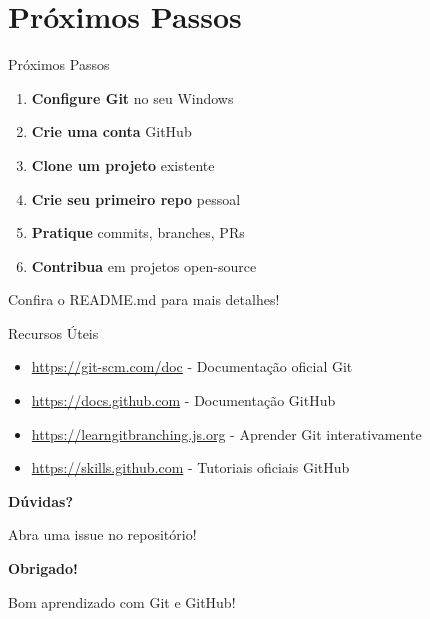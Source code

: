 \documentclass[11pt]{beamer}
\begin{document}
\section{Próximos Passos}

\begin{frame}{Próximos Passos}
\begin{enumerate}
    \item \textbf{Configure Git} no seu Windows
    \item \textbf{Crie uma conta} GitHub
    \item \textbf{Clone um projeto} existente
    \item \textbf{Crie seu primeiro repo} pessoal
    \item \textbf{Pratique} commits, branches, PRs
    \item \textbf{Contribua} em projetos open-source
\end{enumerate}

\vspace{0.5cm}

Confira o README.md para mais detalhes!
\end{frame}

\begin{frame}{Recursos Úteis}
\begin{itemize}
    \item \url{https://git-scm.com/doc} - Documentação oficial Git
    \item \url{https://docs.github.com} - Documentação GitHub
    \item \url{https://learngitbranching.js.org} - Aprender Git interativamente
    \item \url{https://skills.github.com} - Tutoriais oficiais GitHub
\end{itemize}

\vspace{0.5cm}

\begin{center}
    \Large \textbf{Dúvidas?}
    
    \vspace{0.3cm}
    
    Abra uma issue no repositório!
\end{center}
\end{frame}

\begin{frame}
\begin{center}
    \Huge \textbf{Obrigado!}
    
    \vspace{0.5cm}
    
    \Large Bom aprendizado com Git e GitHub! 🚀
\end{center}
\end{frame}
\end{document}
